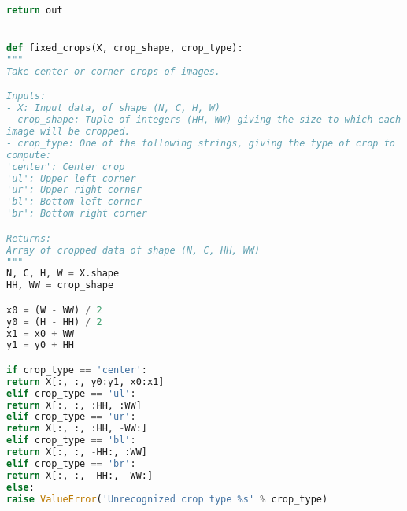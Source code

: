 \begin{lstlisting}[language=Python, label=lst:data_augmentation.py, caption={data\_augmentation.py}, basicstyle=\tiny]
return out


def fixed_crops(X, crop_shape, crop_type):
"""
Take center or corner crops of images.

Inputs:
- X: Input data, of shape (N, C, H, W)
- crop_shape: Tuple of integers (HH, WW) giving the size to which each
image will be cropped.
- crop_type: One of the following strings, giving the type of crop to
compute:
'center': Center crop
'ul': Upper left corner
'ur': Upper right corner
'bl': Bottom left corner
'br': Bottom right corner

Returns:
Array of cropped data of shape (N, C, HH, WW) 
"""
N, C, H, W = X.shape
HH, WW = crop_shape

x0 = (W - WW) / 2
y0 = (H - HH) / 2
x1 = x0 + WW
y1 = y0 + HH

if crop_type == 'center':
return X[:, :, y0:y1, x0:x1]
elif crop_type == 'ul':
return X[:, :, :HH, :WW]
elif crop_type == 'ur':
return X[:, :, :HH, -WW:]
elif crop_type == 'bl':
return X[:, :, -HH:, :WW]
elif crop_type == 'br':
return X[:, :, -HH:, -WW:]
else:
raise ValueError('Unrecognized crop type %s' % crop_type)
\end{lstlisting}